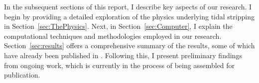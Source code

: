 In the subsequent sections of this report, I describe key aspects of our research. I begin by providing a detailed exploration of the physics underlying tidal stripping in Section~\ref{sec:ThePhysics}. Next, in Section~\ref{sec:Computer}, I explain the computational techniques and methodologies employed in our research. Section~\ref{sec:results} offers a comprehensive summary of the results, some of which have already been published in \citep{2023A&A...673A..44F}. Following this, I present preliminary findings from ongoing work, which is currently in the process of being assembled for publication.


